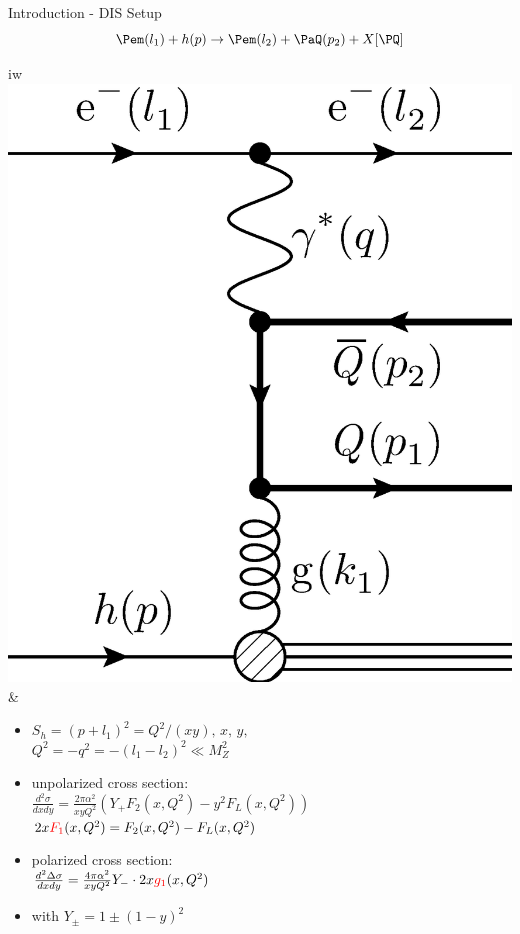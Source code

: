 \begin{frame}{Introduction - DIS Setup}
\[\Pem(l_1)+h(p) \to \Pem(l_2) + \PaQ(p_2) + X[\PQ]\]
\hspace{-.5cm}\begin{tabular}{iw}
\includegraphics[width=.25\textwidth]{img/DIS.eps} &
\begin{itemize}
\item $S_h = (p+l_1)^2 = Q^2/(xy),\,x,\,y,$\\
$Q^2 = -q^2 = - (l_1-l_2)^2 \ll M_Z^2$
\item unpolarized cross section: \\
$\frac{d^2\sigma}{dx dy} = \frac{2\pi \alpha^2}{x y Q^2}\left(Y_+F_2(x,Q^2) - y^2F_L(x,Q^2)\right)$\\
$2x{\color{red}F_1}(x,Q^2) = F_2(x,Q^2) - F_L(x,Q^2)$
\item polarized cross section: \\
$\frac{d^2\Delta\sigma}{dx dy} = \frac{4\pi \alpha^2}{x y Q^2}Y_-\cdot 2x{\color{red}g_1}(x,Q^2)$
\item with $Y_\pm = 1 \pm (1-y)^2$
\end{itemize}
\end{tabular}
\end{frame}


